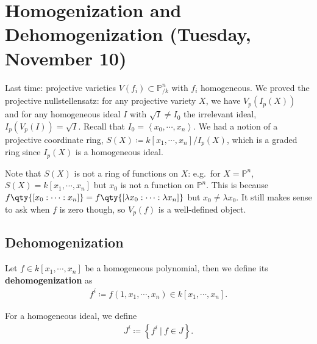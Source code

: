 \hypertarget{homogenization-and-dehomogenization-tuesday-november-10}{%
\section{Homogenization and Dehomogenization (Tuesday, November
10)}\label{homogenization-and-dehomogenization-tuesday-november-10}}

Last time: projective varieties \(V(f_i) \subset {\mathbb{P}}^n_{/k}\)
with \(f_i\) homogeneous. We proved the projective nullstellensatz: for
any projective variety \(X\), we have \(V_p(I_p(X))\) and for any
homogeneous ideal \(I\) with \(\sqrt{I} \neq I_0\) the irrelevant ideal,
\(I_p(V_p(I)) = \sqrt{I}\). Recall that
\(I_0 = \left\langle{x_0, \cdots, x_n}\right\rangle\). We had a notion
of a projective coordinate ring,
\(S(X) \coloneqq k[x_1, \cdots, x_{n}] / I_p(X)\), which is a graded
ring since \(I_p(X)\) is a homogeneous ideal.

\begin{remark}

Note that \(S(X)\) is not a ring of functions on \(X\): e.g.~for
\(X= {\mathbb{P}}^n\), \(S(X) = k[x_1, \cdots, x_{n}]\) but \(x_0\) is
not a function on \({\mathbb{P}}^n\). This is because
\(f\qty{{\left[ {x_0: \cdots : x_n} \right]}} = f\qty{{\left[ {\lambda x_0: \cdots : \lambda x_n} \right]}}\)
but \(x_0\neq \lambda x_0\). It still makes sense to ask when \(f\) is
zero though, so \(V_p(f)\) is a well-defined object.

\end{remark}

\hypertarget{dehomogenization}{%
\subsection{Dehomogenization}\label{dehomogenization}}

\begin{definition}

Let \(f\in k[x_1, \cdots, x_{n}]\) be a homogeneous polynomial, then we
define its \textbf{dehomogenization} as
\begin{align*}  
f^i \coloneqq f(1, x_1, \cdots, x_n) \in k[x_1,\cdots, x_n]
.\end{align*}

For a homogeneous ideal, we define
\begin{align*}  
J^i \coloneqq\left\{{f^i {~\mathrel{\Big|}~}f\in J}\right\}
.\end{align*}

\end{definition}

